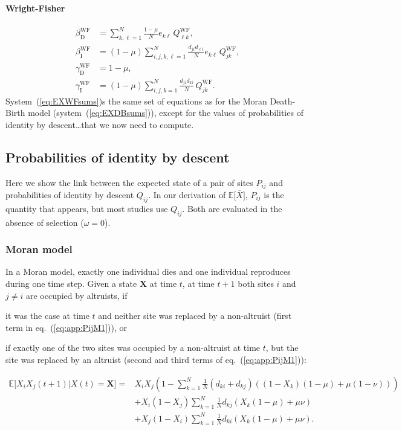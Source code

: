 \documentclass[11pt, letterpaper]{article}
\renewcommand{\eqref}[1]{\textup{{\normalfont eq.~(\ref{#1}}\normalfont)}}
\newcommand{\sysref}[1]{system~(\ref{#1})}
\newcommand{\Sysref}[2]{System~(\ref{#1})}
\newcommand{\Esp}[1]{\mathbb{E}\big[ #1\big]}%
\newcommand{\direct}{\mathrm{D}}
\newcommand{\indirect}{\mathrm{I}}
\newcommand{\WF}{\textrm{WF}}
\newcommand{\mutbias}{\nu}
\begin{document}
\paragraph{Wright-Fisher}
\begin{subequations}\label{eq:EXWFsums}
\begin{align}
\beta_{\direct}^{\WF} &= \sum_{k,\ell=1}^N \frac{1-\mu}{N} e_{k\ell} \, Q_{\ell k}^{\WF},\\
%
\beta_{\indirect}^{\WF} &= (1-\mu) \sum_{i,j,k,\ell=1}^{N} \frac{ d_{ji} d_{\ell i}}{N}   e_{k\ell} \, Q_{jk}^{\WF}, \\ 
%
\gamma_{\direct}^{\WF} &= 1-\mu,\\
%
\gamma_{\indirect}^{\WF} &= (1-\mu)\sum_{i,j,k=1}^N  \frac{ d_{ji} d_{ki}}{N }  \, Q_{jk}^{\WF}.
\end{align}
\end{subequations}
\Sysref{eq:EXWFsums} is the same set of equations as for the Moran Death-Birth model (\sysref{eq:EXDBsums}), except for the values of probabilities of identity by descent\dots that we now need to compute.  

\subsection{Probabilities of identity by descent\label{sec:app:IBD}}

Here we show the link between the expected state of a pair of sites $P_{ij}$ and probabilities of identity by descent $Q_{ij}$. In our derivation of $\Esp{\overline{X}}$, $P_{ij}$ is the quantity that appears, but most studies use $Q_{ij}$. Both are evaluated in the absence of selection ($\omega = 0$). 

\subsubsection{Moran model}
In a Moran model, exactly one individual dies and one individual reproduces during one time step. Given a state $\mathbf{X}$ at time $t$, at time $t+1$ both sites $i$ and $j\neq i$ are occupied by altruists, if \begin{inparaenum}[\it i\rm)]\item it was the case at time $t$ and neither site was replaced by a non-altruist (first term in \eqref{eq:app:PijM1}), or \item if exactly one of the two sites was occupied by a non-altruist at time $t$, but the site was replaced by an altruist (second and third terms of \eqref{eq:app:PijM1}): \end{inparaenum}
%
\begin{align}\label{eq:app:PijM1}
 \Esp{X_iX_j(t+1)|X(t)=\mathbf{X}} = & X_i X_j \left(1 - \sum_{k=1}^N \frac{1}{N} \left( d_{ki} + d_{kj} \right) \left( (1-X_k) (1-\mu) + \mu (1-\mutbias)\right) \right) \nonumber \\
  &+ X_i (1-X_j) \sum_{k=1}^N \frac{1}{N} d_{kj} \left( X_k (1-\mu) + \mu \mutbias \right)  \\
& + X_j (1-X_i) \sum_{k=1}^N \frac{1}{N} d_{ki} \left( X_k (1-\mu) + \mu \mutbias \right). \nonumber
\end{align}
\end{document}
